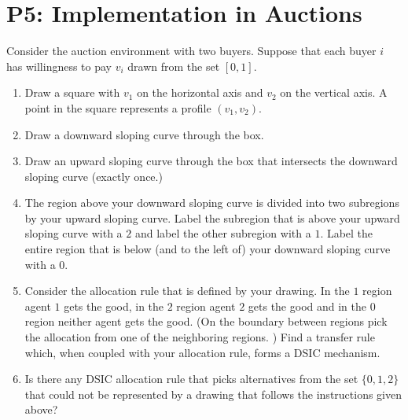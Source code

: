 \documentclass{article}
\newcommand{\enterProblemHeader}[1]{
\nobreak\extramarks{#1}{#1 continued on next page\ldots}\nobreak
\nobreak\extramarks{#1 (continued)}{#1 continued on next page\ldots}\nobreak
}
\newcommand{\exitProblemHeader}[1]{
\nobreak\extramarks{#1 (continued)}{#1 continued on next page\ldots}\nobreak
\nobreak\extramarks{#1}{}\nobreak
}
\newcounter{homeworkProblemCounter} %
\newcommand{\homeworkProblemName}{}
\newenvironment{ex}[1][Problem \arabic{homeworkProblemCounter}]{ %
\stepcounter{homeworkProblemCounter} %
\renewcommand{\homeworkProblemName}{#1} %
\section{\homeworkProblemName} %
}{
}
\newif\ifsolutions
\begin{document}
\begin{ex}[P5: Implementation in Auctions]
	Consider the auction environment with two buyers.  Suppose that each buyer $i$ has willingness to pay
	$v_i$ drawn from the set $[0,1].$
	\begin{enumerate}
		\item Draw a square with $v_1$ on the horizontal axis and $v_2$ on the vertical axis.  A point in the square
		represents a profile $(v_1, v_2)$.
		\item Draw a downward sloping curve through the box.
		\item Draw an upward sloping curve through the box that intersects the downward sloping curve (exactly once.)
		\item The region above your downward sloping curve is divided into two subregions by your upward sloping curve.  Label
		the subregion that is above your upward sloping curve with a $2$ and label the other subregion with a $1$.  Label
		the entire region that is below (and to the left of) your downward sloping curve with a $0$.
		\item Consider the allocation rule that is defined by your drawing.  In the $1$ region agent $1$ gets the
		good, in the $2$ region agent $2$ gets the good and in the $0$ region neither agent gets the good.  (On the boundary
		between regions pick the allocation from one of the neighboring regions. )  Find a transfer rule which, when
		coupled with your allocation rule, forms a DSIC mechanism.
		\item Is there any DSIC allocation rule that picks alternatives from the set $\{0,1,2\}$ that could not be represented
		by a drawing that follows the instructions given above?
	\end{enumerate}
	
	
	\ifsolutions

\end{ex}
\end{document}
